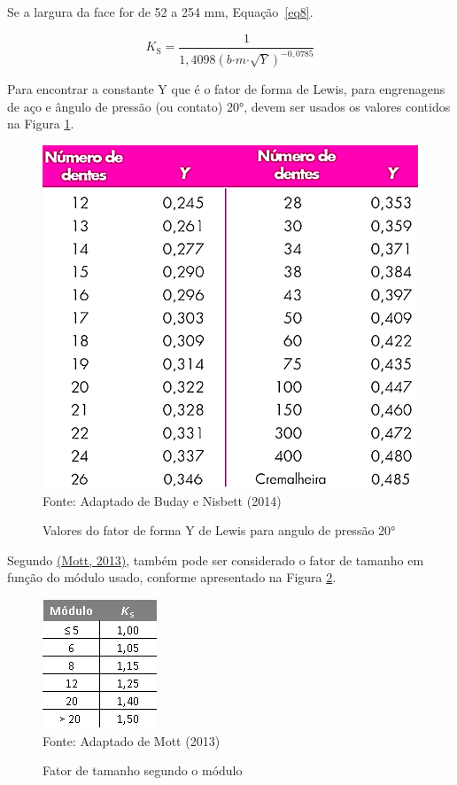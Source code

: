 \documentclass[12pt,a4paper]{article}
\begin{document}
Se a largura da face for de 52 a 254 mm, Equação~{\ref{eq8}}.

\begin{equation}
    \label{eq8}
K_{\mathrm{S}}\mathrm{=}\frac{\mathrm{1}}{\mathrm{1,4098}{\left(b\mathrm{\cdot }m\mathrm{\cdot }\sqrt{Y}\right)}^{\mathrm{-}\mathrm{0,0785}}}
\end{equation}

Para encontrar a constante Y que é o fator de forma de Lewis, para
engrenagens de aço e ângulo de pressão (ou contato) 20°, devem ser
usados os valores contidos na Figura \ref{fig:7}.

\begin{figure}[!htb]
    \centering
    \caption{Valores do fator de forma Y de Lewis para angulo de pressão 20°}
    \includegraphics[scale=0.9]{Imagens/Img7.png}\\
    {\footnotesize Fonte: Adaptado de Buday e Nisbett (2014)}
    \label{fig:7}
\end{figure}

Segundo \hyperref[csl:21]{(Mott, 2013)}, também pode ser considerado o fator de
tamanho em função do módulo usado, conforme apresentado na Figura
{\ref{fig:8}}.

\begin{figure}[!htb]
    \centering
    \caption{Fator de tamanho segundo o módulo}
    \includegraphics[scale=0.9]{Imagens/Img8.png}\\
    {\footnotesize Fonte: Adaptado de Mott (2013)}
    \label{fig:8}
\end{figure}
\end{document}
